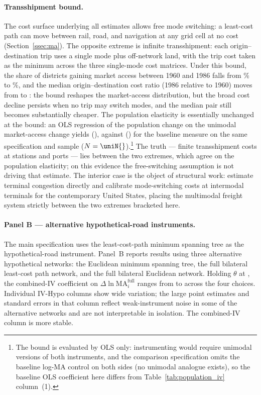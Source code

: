 


\paragraph{Transshipment bound.}
The cost surface underlying all estimates allows free mode switching:
a least-cost path can move between rail, road, and navigation at any
grid cell at no cost (Section~\ref{ssec:ma}). The opposite extreme is
infinite transshipment: each origin--destination trip uses a single
mode plus off-network land, with the trip cost taken as the minimum
across the three single-mode cost matrices. Under this bound, the
share of districts gaining market access between 1960 and 1986 falls
from \uniGainShareBase\% to \uniGainShareUni\%, and the median
origin--destination cost ratio (1986 relative to 1960) moves from
\uniMedRatioBase{} to \uniMedRatioUni{}: the bound reshapes the
market-access distribution, but the broad
cost decline persists when no trip may switch modes, and the median
pair still becomes substantially cheaper. The population
elasticity is essentially unchanged at the bound: an OLS regression
of the population change on the unimodal market-access change yields
\uniOLSUni{} (\uniOLSUniSE{}), against \uniOLSBase{} (\uniOLSBaseSE{})
for the baseline measure on the same specification and
sample ($N = \uniN{}$).\footnote{The bound is evaluated by OLS only:
instrumenting would require unimodal versions of both instruments,
and the comparison specification omits the baseline log-MA control on
both sides (no unimodal analogue exists), so the baseline OLS
coefficient here differs from Table~\ref{tab:population_iv}
column~(1).} The truth --- finite transshipment costs at
stations and ports --- lies between the two extremes, which agree on
the population elasticity; on this evidence the free-switching
assumption is not driving that estimate. The interior case is the
object of structural work: \citet{fuchswong2026} estimate terminal
congestion directly and calibrate mode-switching costs at intermodal
terminals for the contemporary United States, placing the multimodal
freight system strictly between the two extremes bracketed here.

\paragraph{Panel B --- alternative hypothetical-road instruments.}
The main specification uses the least-cost-path minimum spanning
tree as the hypothetical-road instrument. Panel~B reports results
using three alternative hypothetical networks: the Euclidean
minimum spanning tree, the full bilateral least-cost path network,
and the full bilateral Euclidean network. Holding $\theta$ at \thetaLow{},
the combined-IV coefficient on $\Delta \ln \mathrm{MA}^{\mathrm{full}}_i$
ranges from \hypoAltIVBMin{} to \hypoAltIVBMax{} across the four choices. Individual
IV-Hypo columns show wide variation; the large point estimates and
standard errors in that column reflect weak-instrument noise in
some of the alternative networks and are not interpretable in
isolation. The combined-IV column is more stable.

